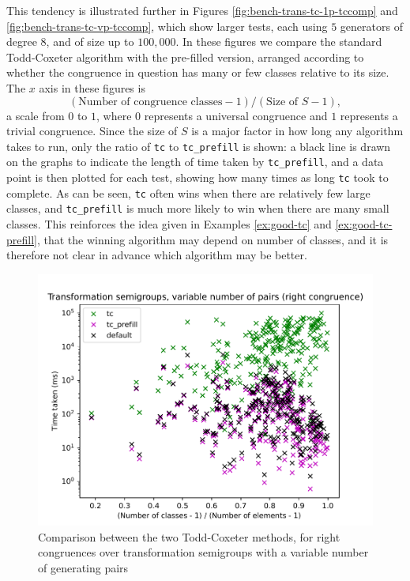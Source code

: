 This tendency is illustrated further in Figures
\ref{fig:bench-trans-tc-1p-tccomp} and
\ref{fig:bench-trans-tc-vp-tccomp}, which show larger tests, each using $5$
generators of degree $8$, and of size up to $100,000$.  In these figures we
compare the standard Todd-Coxeter algorithm with the pre-filled version, arranged
according to whether the congruence in question has many or few classes relative
to its size.  The $x$ axis in these figures is
$$(\text{Number of congruence classes} - 1) / (\text{Size of~} S - 1),$$
a scale from $0$ to $1$, where $0$ represents a universal congruence and $1$
represents a trivial congruence.  Since the size of $S$ is a major factor in how
long any algorithm takes to run, only the ratio of \texttt{tc} to
\texttt{tc\_prefill} is shown: a black line is drawn on the graphs to indicate
the length of time taken by \texttt{tc\_prefill}, and a data point is then
plotted for each test, showing how many times as long \texttt{tc} took to
complete.  As can be seen, \texttt{tc} often wins when there are relatively few
large classes, and \texttt{tc\_prefill} is much more likely to win when there are
many small classes.  This reinforces the idea given in Examples \ref{ex:good-tc}
and \ref{ex:good-tc-prefill}, that the winning algorithm may depend on number of
classes, and it is therefore not clear in advance which algorithm may be better.

\begin{figure}[h]
  \centering
  \includegraphics[width=\textwidth]{pics/ch-pairs/bench-trans-tc-vp-right-bynrclasses}
  \caption{Comparison between the two Todd-Coxeter methods, for right
    congruences over transformation semigroups with a variable number of
    generating pairs}
  \label{fig:bench-trans-tc-vp-right-bynrclasses}
\end{figure}


